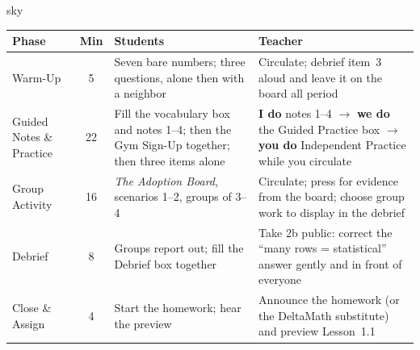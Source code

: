\documentclass[10pt]{article}
\begin{document}
\boxguard[30]
\begin{skillbox}{sky}
\renewcommand{\arraystretch}{1.25}
\begin{tabularx}{\linewidth}{@{}l c X X@{}}
\textbf{Phase} & \textbf{Min} & \textbf{Students} & \textbf{Teacher} \\
\hline
Warm-Up & 5 & Seven bare numbers; three questions, alone then with a neighbor & Circulate; debrief item~3 aloud and leave it on the board all period \\
Guided Notes \& Practice & 22 & Fill the vocabulary box and notes 1--4; then the Gym Sign-Up together; then three items alone & \textbf{I do} notes 1--4 $\to$ \textbf{we do} the Guided Practice box $\to$ \textbf{you do} Independent Practice while you circulate \\
Group Activity & 16 & \emph{The Adoption Board}, scenarios 1--2, groups of 3--4 & Circulate; press for evidence from the board; choose group work to display in the debrief \\
Debrief & 8 & Groups report out; fill the Debrief box together & Take 2b public: correct the ``many rows = statistical'' answer gently and in front of everyone \\
Close \& Assign & 4 & Start the homework; hear the preview & Announce the homework (or the DeltaMath substitute) and preview Lesson~1.1 \\
\end{tabularx}
\end{skillbox}
\end{document}
